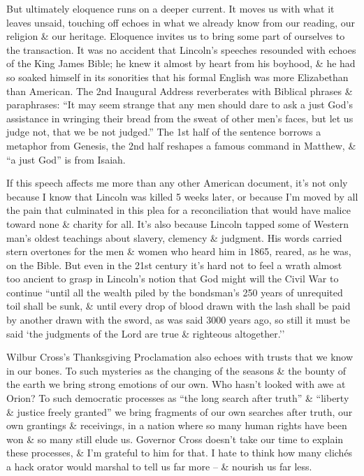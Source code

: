 \documentclass{article}
\numberwithin{equation}{section}
\begin{document}
But ultimately eloquence runs on a deeper current. It moves us with what it leaves unsaid, touching off echoes in what we already know from our reading, our religion \& our heritage. Eloquence invites us to bring some part of ourselves to the transaction. It was no accident that Lincoln's speeches resounded with echoes of the King James Bible; he knew it almost by heart from his boyhood, \& he had so soaked himself in its sonorities that his formal English was more Elizabethan than American. The 2nd Inaugural Address reverberates with Biblical phrases \& paraphrases: ``It may seem strange that any men should dare to ask a just God's assistance in wringing their bread from the sweat of other men's faces, but let us judge not, that we be not judged.'' The 1st half of the sentence borrows a metaphor from Genesis, the 2nd half reshapes a famous command in Matthew, \& ``a just God'' is from Isaiah.

If this speech affects me more than any other American document, it's not only because I know that Lincoln was killed 5 weeks later, or because I'm moved by all the pain that culminated in this plea for a reconciliation that would have malice toward none \& charity for all. It's also because Lincoln tapped some of Western man's oldest teachings about slavery, clemency \& judgment. His words carried stern overtones for the men \& women who heard him in 1865, reared, as he was, on the Bible. But even in the 21st century it's hard not to feel a wrath almost too ancient to grasp in Lincoln's notion that God might will the Civil War to continue ``until all the wealth piled by the bondsman's 250 years of unrequited toil shall be sunk, \& until every drop of blood drawn with the lash shall be paid by another drawn with the sword, as was said 3000 years ago, so still it must be said `the judgments of the Lord are true \& righteous altogether.''

Wilbur Cross's Thanksgiving Proclamation also echoes with trusts that we know in our bones. To such mysteries as the changing of the seasons \& the bounty of the earth we bring strong emotions of our own. Who hasn't looked with awe at Orion? To such democratic processes as ``the long search after truth'' \& ``liberty \& justice freely granted'' we bring fragments of our own searches after truth, our own grantings \& receivings, in a nation where so many human rights have been won \& so many still elude us. Governor Cross doesn't take our time to explain these processes, \& I'm grateful to him for that. I hate to think how many clich\'es a hack orator would marshal to tell us far more -- \& nourish us far less.
\end{document}
